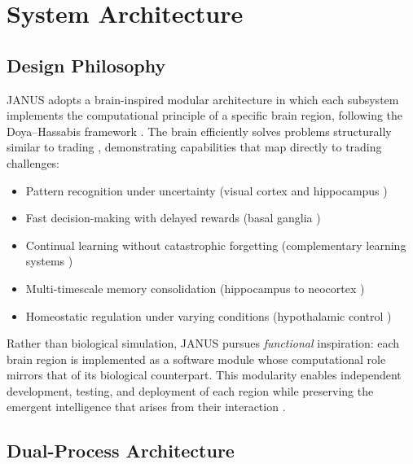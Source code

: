 \documentclass[12pt, a4paper]{article}
\begin{document}
\section{System Architecture}
\label{sec:architecture}

\subsection{Design Philosophy}
\label{sec:design_philosophy}

JANUS adopts a brain-inspired modular architecture in which each subsystem implements the computational principle of a specific brain region, following the Doya--Hassabis framework \citep{doya1999computations, hassabis2017neuroscience}. The brain efficiently solves problems structurally similar to trading \citep{daw2006cortical}, demonstrating capabilities that map directly to trading challenges:

\begin{itemize}
	\item Pattern recognition under uncertainty (visual cortex and hippocampus \citep{buzsaki2015hippocampal})
	\item Fast decision-making with delayed rewards (basal ganglia \citep{collins2014opponent})
	\item Continual learning without catastrophic forgetting (complementary learning systems \citep{mcclelland1995complementary})
	\item Multi-timescale memory consolidation (hippocampus to neocortex \citep{buzsaki2015hippocampal})
	\item Homeostatic regulation under varying conditions (hypothalamic control \citep{sterling2012allostasis})
\end{itemize}

Rather than biological simulation, JANUS pursues \textit{functional} inspiration: each brain region is implemented as a software module whose computational role mirrors that of its biological counterpart. This modularity enables independent development, testing, and deployment of each region while preserving the emergent intelligence that arises from their interaction \citep{caligiore2019superlearning}.

\subsection{Dual-Process Architecture}
\label{sec:dual_process}
\end{document}

